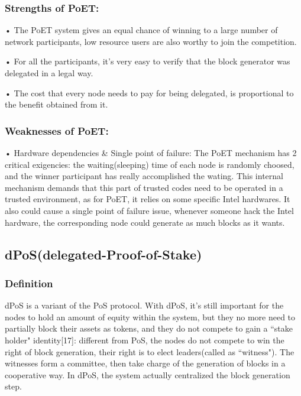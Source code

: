 \documentclass[]{article}
\begin{document}
\begin{CJK*}{UTF8}{gbsn}
	\subsubsection*{Strengths of PoET:}	
    • The PoET system gives an equal chance of winning to a large number of network participants, low resource users are also worthy to join the competition.
    \par • For all the participants, it’s very easy to verify that the block generator was delegated in a legal way.
    \par • The cost that every node needs to pay for being delegated, is proportional to the benefit obtained from it.
\subsubsection*{Weaknesses of PoET:}
    • Hardware dependencies \& Single point of failure: The PoET mechanism has 2 critical exigencies: the waiting(sleeping) time of each node is randomly choosed, and the winner participant has really accomplished the wating. This internal mechanism demands that this part of trusted codes need to be operated in a trusted environment, as for PoET, it relies on some specific Intel hardwares. It also could cause a single point of failure issue, whenever someone hack the Intel hardware, the corresponding node could generate as much blocks as it wants.

\subsection{dPoS(delegated-Proof-of-Stake)}
\subsubsection*{Definition}	
dPoS is a variant of the PoS protocol. With dPoS, it's still important for the nodes to hold an amount of equity within the system, but they no more need to partially block their assets as tokens, and they do not compete to gain a ``stake holder" identity[17]: different from PoS, the nodes do not compete to win the right of block generation, their right is to elect leaders(called as ``witness"). The witnesses form a committee, then take charge of the generation of blocks in a cooperative way. In dPoS, the system actually centralized the block generation step.

\end{CJK*}
\end{document}
